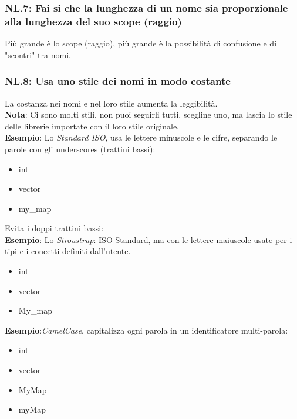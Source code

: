 \subsubsection{NL.7: Fai si che la lunghezza di un nome sia proporzionale alla lunghezza del suo scope (raggio)}

\textsf{\small Più grande è lo scope (raggio), più grande è la possibilità di confusione e di "scontri" tra nomi.} \\

\subsubsection{NL.8: Usa uno stile dei nomi in modo costante}

\textsf{\small La costanza nei nomi e nel loro stile aumenta la leggibilità.} \\

\textsf{\small \textbf{Nota}: Ci sono molti stili, non puoi seguirli tutti, scegline uno, ma lascia lo stile delle librerie importate con il loro stile originale.} \\

\textsf{\small \textbf{Esempio}: Lo \emph{Standard ISO}, usa le lettere minuscole e le cifre, separando le parole con gli underscores (trattini bassi):}

\begin{itemize}
	\item \textsf{\small int}
	\item \textsf{\small vector}
	\item \textsf{\small my\_map}
\end{itemize}

\textsf{\small Evita i doppi trattini bassi: \_\_} \\

\textsf{\small \textbf{Esempio}: Lo \emph{Stroustrup}: ISO Standard, ma con le lettere maiuscole usate per i tipi e i concetti definiti dall'utente. }

\begin{itemize}
	\item \textsf{\small int}
	\item \textsf{\small vector}
	\item \textsf{\small My\_map}
\end{itemize}

\textsf{\small \textbf{Esempio}:\emph{CamelCase}, capitalizza ogni parola in un identificatore multi-parola: }

\begin{itemize}
	\item \textsf{\small int}
	\item \textsf{\small vector}
	\item \textsf{\small MyMap}
	\item \textsf{\small myMap}
\end{itemize}


